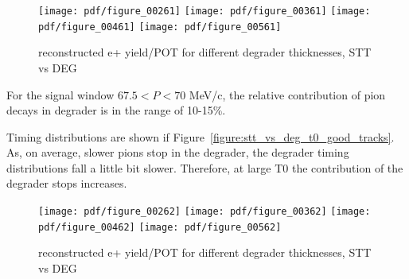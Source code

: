 


\begin{figure}[H]
  \texttt{[image: pdf/figure\_00261]}
  \texttt{[image: pdf/figure\_00361]}
  \texttt{[image: pdf/figure\_00461]}
  \texttt{[image: pdf/figure\_00561]}
  \caption{
    \label{fig:stt_vs_deg_momentum_good_tracks}
    reconstructed e+ yield/POT for different degrader thicknesses, STT vs DEG
  }
\end{figure}

For the signal window $67.5 < P < 70$ MeV/c, the relative contribution of pion
decays in degrader is in the range of 10-15\%.

Timing distributions are shown if Figure~\ref{figure:stt_vs_deg_t0_good_tracks}.
As, on average, slower pions stop in the degrader, the degrader timing distributions
fall a little bit slower.
Therefore, at large T0 the contribution of the degrader stops increases.


\begin{figure}[H]
  \texttt{[image: pdf/figure\_00262]}
  \texttt{[image: pdf/figure\_00362]}
  \texttt{[image: pdf/figure\_00462]}
  \texttt{[image: pdf/figure\_00562]}
  \caption{
    \label{figure:stt_vs_deg_t0}
    reconstructed e+ yield/POT for different degrader thicknesses, STT vs DEG
  }
\end{figure}

